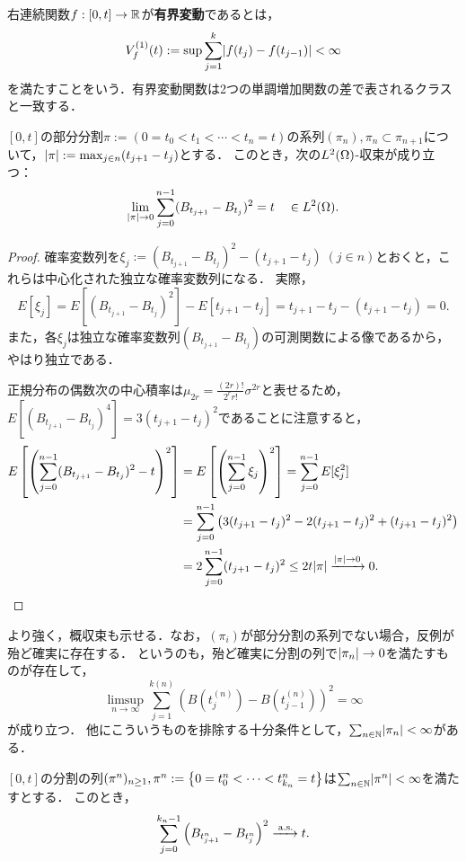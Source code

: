 \documentclass[uplatex,dvipdfmx]{jsreport}
\begin{document}
\begin{definition}
    右連続関数$f:[0,t]\to\mathbb{R}$が\textbf{有界変動}であるとは，
    \[V_f^{(1)}(t):=\sup\sum^k_{j=1}\lvert f(t_j)-f(t_{j-1})\rvert<\infty\]
    を満たすことをいう．有界変動関数は2つの単調増加関数の差で表されるクラスと一致する．
\end{definition}

\begin{proposition}[2次変動の$L^2$-収束]
    $[0,t]$の部分分割$\pi:=(0=t_0<t_1<\cdots<t_n=t)$の系列$(\pi_n),\pi_n\subset\pi_{n+1}$について，$\lvert\pi\rvert:=\max_{j\in n}(t_{j+1}-t_j)$とする．
    このとき，次の$L^2(\Omega)$-収束が成り立つ：
    \[\lim_{\lvert\pi\rvert\to0}\sum^{n-1}_{j=0}(B_{t_{j+1}}-B_{t_j})^2=t\quad\in L^2(\Omega).\]
\end{proposition}
\begin{proof}
    確率変数列を$\xi_j:=(B_{t_{j+1}}-B_{t_j})^2-(t_{j+1}-t_j)\;(j\in n)$とおくと，これらは中心化された独立な確率変数列になる．
    実際，
    \[E[\xi_j]=E[(B_{t_{j+1}}-B_{t_j})^2]-E[t_{j+1}-t_j]=t_{j+1}-t_j-(t_{j+1}-t_j)=0.\]
    また，各$\xi_j$は独立な確率変数列$(B_{t_{j+1}}-B_{t_j})$の可測関数による像であるから，やはり独立である．
    
    正規分布の偶数次の中心積率は$\mu_{2r}=\frac{(2r)!}{2^rr!}\sigma^{2r}$と表せるため，$E[(B_{t_{j+1}}-B_{t_j})^4]=3(t_{j+1}-t_j)^2$であることに注意すると，
    \begin{align*}
        E\left[\left(\sum^{n-1}_{j=0}(B_{t_{j+1}}-B_{t_j})^2-t\right)^2\right]&=E\left[\left(\sum^{n-1}_{j=0}\xi_j\right)^2\right]=\sum^{n-1}_{j=0}E[\xi^2_j]\\
        &=\sum^{n-1}_{j=0}\left(3(t_{j+1}-t_j)^2-2(t_{j+1}-t_j)^2+(t_{j+1}-t_j)^2\right)\\
        &=2\sum^{n-1}_{j=0}(t_{j+1}-t_j)^2\le 2t\lvert\pi\rvert\xrightarrow{\lvert\pi\rvert\to0}0.
    \end{align*}
\end{proof}
\begin{remark}
    より強く，概収束も示せる．なお，$(\pi_i)$が部分分割の系列でない場合，反例が殆ど確実に存在する．
    というのも，殆ど確実に分割の列で$\lvert\pi_n\rvert\to 0$を満たすものが存在して，
    \[\limsup_{n\to\infty}\sum^{k(n)}_{j=1}(B(t_j^{(n)})-B(t^{(n)}_{j-1}))^2=\infty\]
    が成り立つ．
    他にこういうものを排除する十分条件として，$\sum_{n\in\mathbb{N}}\lvert\pi_n\rvert<\infty$がある．
\end{remark}

\begin{proposition}[2次変動の概収束]
    $[0,t]$の分割の列$(\pi^n)_{n\ge 1},\pi^n:=\left\{0=t^n_0<\cdots<t^n_{k_n}=t\right\}$は$\sum_{n\in\mathbb{N}}\lvert\pi^n\rvert<\infty$を満たすとする．
    このとき，
    \[\sum^{k_n-1}_{j=0}\left(B_{t^n_{j+1}}-B_{t^n_j}\right)^2\xrightarrow{\;\mathrm{a.s.}}t.\]
\end{proposition}
\end{document}
